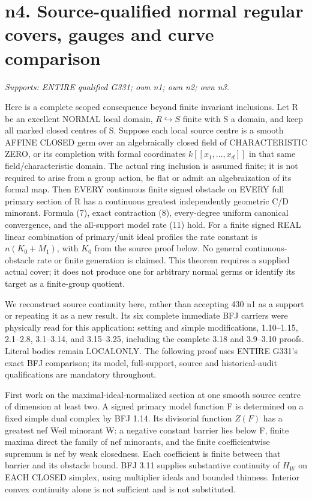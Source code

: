 \section{n4. Source-qualified normal regular covers, gauges and curve comparison}
\textit{Supports: ENTIRE qualified G331; own n1; own n2; own n3.}

Here is a complete scoped consequence beyond finite invariant inclusions.
Let R be an excellent NORMAL local domain, $R\hookrightarrow S$ finite
with S a domain, and keep all marked closed centres of S. Suppose each
local source centre is a smooth AFFINE CLOSED germ over an algebraically
closed field of CHARACTERISTIC ZERO, or its completion with formal
coordinates $k[[x_1,\ldots,x_d]]$ in that same field/characteristic domain.
The actual ring inclusion is assumed finite; it is not required to arise
from a group action, be flat or admit an algebraization of its formal map.
Then EVERY continuous finite signed obstacle on EVERY full primary
section of R has a continuous greatest independently geometric C/D
minorant. Formula (7), exact contraction (8), every-degree uniform
canonical convergence, and the all-support model rate (11) hold.
For a finite signed REAL linear combination of primary/unit ideal
profiles the rate constant is $n(K_0+M_1)$, with $K_0$ from the source
proof below. No general continuous-obstacle rate or finite generation
is claimed. This theorem requires a supplied actual cover; it does not
produce one for arbitrary normal germs or identify its target as a
finite-group quotient.

We reconstruct source continuity here, rather than accepting 430 n1
as a support or repeating it as a new result. Its six complete immediate
BFJ carriers were physically read for this application: setting and
simple modifications, 1.10--1.15, 2.1--2.8, 3.1--3.14, and 3.15--3.25,
including the complete 3.18 and 3.9--3.10 proofs. Literal bodies remain
LOCALONLY. The following proof uses ENTIRE G331's exact BFJ comparison;
its model, full-support, source and historical-audit qualifications are
mandatory throughout.

First work on the maximal-ideal-normalized section at one smooth source
centre of dimension at least two. A signed primary model function F is
determined on a fixed simple dual complex by BFJ 1.14. Its divisorial
function $Z(F)$ has a greatest nef Weil minorant W: a negative constant
barrier lies below F, finite maxima direct the family of nef minorants,
and the finite coefficientwise supremum is nef by weak closedness.
Each coefficient is finite between that barrier and its obstacle bound.
BFJ 3.11 supplies substantive continuity of $H_W$ on EACH CLOSED simplex,
using multiplier ideals and bounded thinness. Interior convex continuity
alone is not sufficient and is not substituted.

